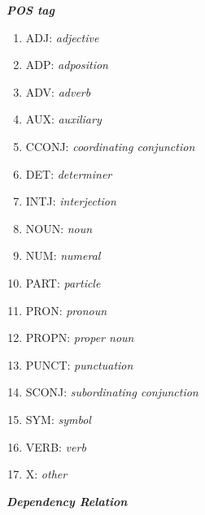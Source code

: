 \textbf{\textit{POS tag}}

\begin{multicols}{2}
	\begin{enumerate}
		\item ADJ: \textit{adjective}
		\item ADP: \textit{adposition}
		\item ADV: \textit{adverb}
		\item AUX: \textit{auxiliary}
		\item CCONJ: \textit{coordinating conjunction}
		\item DET: \textit{determiner}
		\item INTJ: \textit{interjection}
		\item NOUN: \textit{noun}
		\item NUM: \textit{numeral}
		\item PART: \textit{particle}
		\item PRON: \textit{pronoun}
		\item PROPN: \textit{proper noun}
		\item PUNCT: \textit{punctuation}
		\item SCONJ: \textit{subordinating conjunction}
		\item SYM: \textit{symbol}
		\item VERB: \textit{verb}
		\item X: \textit{other}
	\end{enumerate}
\end{multicols}

\noindent\textbf{\textit{Dependency Relation}}

